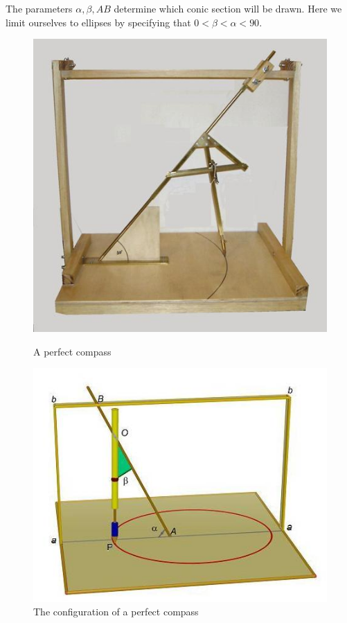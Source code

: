 The parameters $\alpha, \beta, AB$ determine which conic section will be drawn. Here we limit ourselves to ellipses by specifying that $0< \beta <\alpha< 90$. 
\begin{figure}[h]
\begin{minipage}{.45\textwidth}
\begin{center}
\includegraphics[width=.9\textwidth,keepaspectratio=true]{perfect1.jpg}
\medskip
\caption{A perfect compass}\label{f.perfect-image1}
\end{center}
\end{minipage}
\hfill
\begin{minipage}{.55\textwidth}
\begin{center}
\includegraphics[width=\textwidth,keepaspectratio=true]{perfect2.jpg}
\caption{The configuration of a perfect compass}\label{f.perfect-image2}
\end{center}
\end{minipage}
\end{figure}

